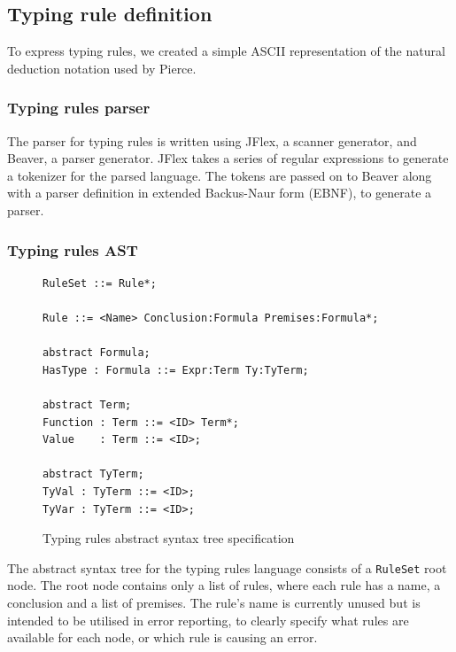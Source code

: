 \documentclass[nofilelist]{cslthse-msc}
\newcommand{\CR}[1]{\textcolor{green!60!black}{[\textbf{CR}:#1]}}
\begin{document}
\subsection{Typing rule definition}\label{typingruledefinition}
To express typing rules, we created a simple ASCII representation of the natural deduction notation used by Pierce\cite{Pierce}.


\subsubsection{Typing rules parser}\label{typingrulesparser}
The parser for typing rules is written using JFlex\cite{jflex}, a scanner generator, and Beaver\cite{beaver}, a parser generator.
JFlex takes a series of regular expressions to generate a tokenizer for the parsed language.
The tokens are passed on to Beaver along with a parser definition in extended Backus-Naur form (EBNF), to generate a parser.


\subsubsection{Typing rules AST}\label{typingrulesast}
\begin{figure}[]
\begin{lstlisting}[]
RuleSet ::= Rule*;

Rule ::= <Name> Conclusion:Formula Premises:Formula*;

abstract Formula;
HasType : Formula ::= Expr:Term Ty:TyTerm;

abstract Term;
Function : Term ::= <ID> Term*;
Value    : Term ::= <ID>;

abstract TyTerm;
TyVal : TyTerm ::= <ID>;
TyVar : TyTerm ::= <ID>;
\end{lstlisting}
  \caption{Typing rules abstract syntax tree specification}
  \label{trastspec}
\end{figure}

The abstract syntax tree for the typing rules language consists of a \lstinline{RuleSet} root node.
The root node contains only a list of rules, where each rule has a name, a conclusion and a list of premises.
The rule's name is currently unused but is intended to be utilised in error reporting, to clearly specify what rules are available for each node, or which rule is causing an error.
\end{document}
